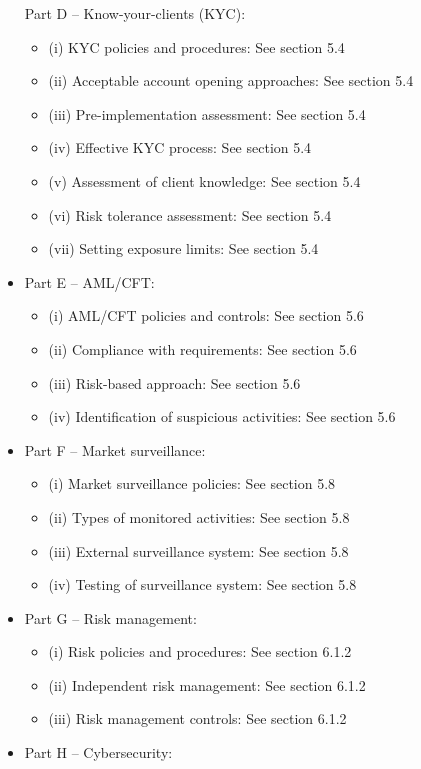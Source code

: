 \documentclass[]{report}
\begin{document}
\begin{itemize}
Part D – Know-your-clients (KYC):
\begin{itemize}
\item (i) KYC policies and procedures: See section 5.4
\item (ii) Acceptable account opening approaches: See section 5.4
\item (iii) Pre-implementation assessment: See section 5.4
\item (iv) Effective KYC process: See section 5.4
\item (v) Assessment of client knowledge: See section 5.4
\item (vi) Risk tolerance assessment: See section 5.4
\item (vii) Setting exposure limits: See section 5.4
\end{itemize}

\item Part E – AML/CFT:
  \begin{itemize}
\item (i) AML/CFT policies and controls: See section 5.6
\item (ii) Compliance with requirements: See section 5.6
\item (iii) Risk-based approach: See section 5.6
\item (iv) Identification of suspicious activities: See section 5.6
\end{itemize}
\item Part F – Market surveillance:
  \begin{itemize}
\item (i) Market surveillance policies: See section 5.8
\item (ii) Types of monitored activities: See section 5.8
\item (iii) External surveillance system: See section 5.8
\item (iv) Testing of surveillance system: See section 5.8
\end{itemize}
\item Part G – Risk management:
    \begin{itemize}
\item (i) Risk policies and procedures: See section 6.1.2
\item (ii) Independent risk management: See section 6.1.2
\item (iii) Risk management controls: See section 6.1.2
\end{itemize}
\item Part H – Cybersecurity:
  \begin{itemize}

\end{itemize}
\end{itemize}
\end{document}
